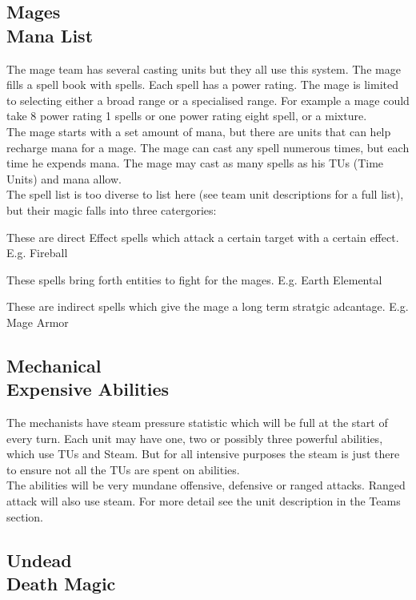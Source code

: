 \documentclass[a4paper]{article}
\begin{document}
\subsection{Mages \\ Mana List}

The mage team has several casting units but they all use this system. The mage fills a spell book with spells. Each spell has a power rating. The mage is limited to selecting either a broad range or a specialised range. For example a mage could take 8 power rating 1 spells or one power rating eight spell, or a mixture.\\
The mage starts with a set amount of mana, but there are units that can help recharge mana for a mage. The mage can cast any spell numerous times, but each time he expends mana. The mage may cast as many spells as his TUs (Time Units) and mana allow.\\
The spell list is too diverse to list here (see team unit descriptions for a full list), but their magic falls into three catergories:

These are direct Effect spells which attack a certain target with a certain effect. E.g. Fireball

These spells bring forth entities to fight for the mages. E.g. Earth Elemental

These are indirect spells which give the mage a long term stratgic adcantage. E.g. Mage Armor

\subsection{Mechanical \\ Expensive Abilities}

The mechanists have steam pressure statistic which will be full at the start of every turn. Each unit may have one, two or possibly three powerful abilities, which use TUs and Steam. But for all intensive purposes the steam is just there to ensure not all the TUs are spent on abilities.\\
The abilities will be very mundane offensive, defensive or ranged attacks. Ranged attack will also use steam. For more detail see the unit description in the Teams section.

\subsection{Undead \\ Death Magic}
\end{document}
